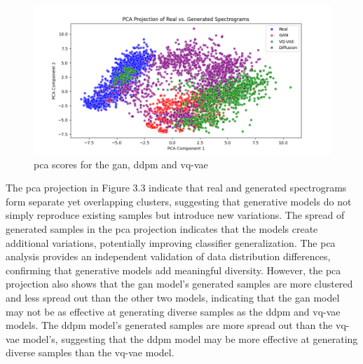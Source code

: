 \begin{figure}[h]
\includegraphics[width=\textwidth]{figures/PCA (1).png}
\centering
\caption{ \gls{pca} scores for the \gls{gan}, \gls{ddpm} and \gls{vq-vae}}
\centering
\end{figure}
The \gls{pca} projection in Figure 3.3 indicate that real and generated spectrograms form separate yet overlapping clusters, suggesting that generative models do not simply reproduce existing samples but introduce new variations. The spread of generated samples in the \gls{pca} projection indicates that the models create additional variations, potentially improving classifier generalization. The \gls{pca} analysis provides an independent validation of data distribution differences, confirming that generative models add meaningful diversity.
However, the \gls{pca} projection also shows that the \gls{gan} model's generated samples are more clustered and less spread out than the other two models, indicating that the \gls{gan} model may not be as effective at generating diverse samples as the \gls{ddpm} and \gls{vq-vae} models. The \gls{ddpm} model's generated samples are more spread out than the \gls{vq-vae} model's, suggesting that the \gls{ddpm} model may be more effective at generating diverse samples than the \gls{vq-vae} model.


